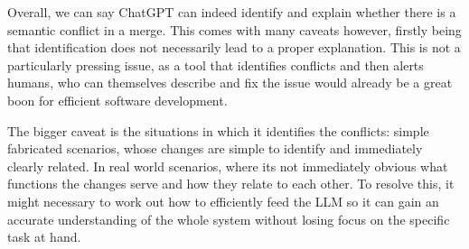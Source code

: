Overall, we can say ChatGPT can indeed identify and explain whether there is a semantic conflict in a merge. This comes with many caveats however, firstly being that identification does not necessarily lead to a proper explanation. This is not a particularly pressing issue, as a tool that identifies conflicts and then alerts humans, who can themselves describe and fix the issue would already be a great boon for efficient software development.

The bigger caveat is the situations in which it identifies the conflicts: simple fabricated scenarios, whose changes are simple to identify and immediately clearly related. In real world scenarios, where its not immediately obvious what functions the changes serve and how they relate to each other. To resolve this, it might necessary to work out how to efficiently feed the LLM so it can gain an accurate understanding of the whole system without losing focus on the specific task at hand.
